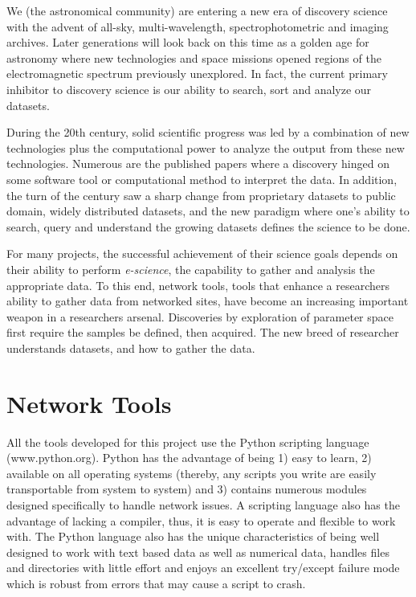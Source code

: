 \documentclass[11pt,preprint,graphicx]{aastex}
\begin{document}
\noindent We (the astronomical community) are entering a new era of
discovery science with the advent of all-sky, multi-wavelength,
spectrophotometric and imaging archives.  Later generations will look back
on this time as a golden age for astronomy where new technologies and space
missions opened regions of the electromagnetic spectrum previously
unexplored.  In fact, the current primary inhibitor to discovery science is
our ability to search, sort and analyze our datasets.

\noindent During the 20th century, solid scientific progress was led by a
combination of new technologies plus the computational power to analyze
the output from these new technologies.  Numerous are the published papers
where a discovery hinged on some software tool or computational method
to interpret the data.  In addition, the turn of the century saw a sharp
change from proprietary datasets to public domain, widely distributed
datasets, and the new paradigm where one's ability to search, query and
understand the growing datasets defines the science to be done.

\noindent For many projects, the successful achievement of their science
goals depends on their ability to perform {\it e-science}, the capability to
gather and analysis the appropriate data.  To this end, network tools,
tools that enhance a researchers ability to gather data from networked sites,
have become an increasing important weapon in a researchers arsenal.
Discoveries by exploration of parameter space first require the samples be
defined, then acquired.  The new breed of researcher understands datasets,
and how to gather the data.

\section{Network Tools}

\noindent All the tools developed for this project use the Python scripting
language (www.python.org).  Python has the advantage of being 1) easy to
learn, 2) available on all operating systems (thereby, any scripts you
write are easily transportable from system to system) and 3) contains
numerous modules designed specifically to handle network issues.  A
scripting language also has the advantage of lacking a compiler, thus, it
is easy to operate and flexible to work with.  The Python language also has
the unique characteristics of being well designed to work with text based
data as well as numerical data, handles files and directories with little
effort and enjoys an excellent try/except failure mode which is robust from
errors that may cause a script to crash.
\end{document}

